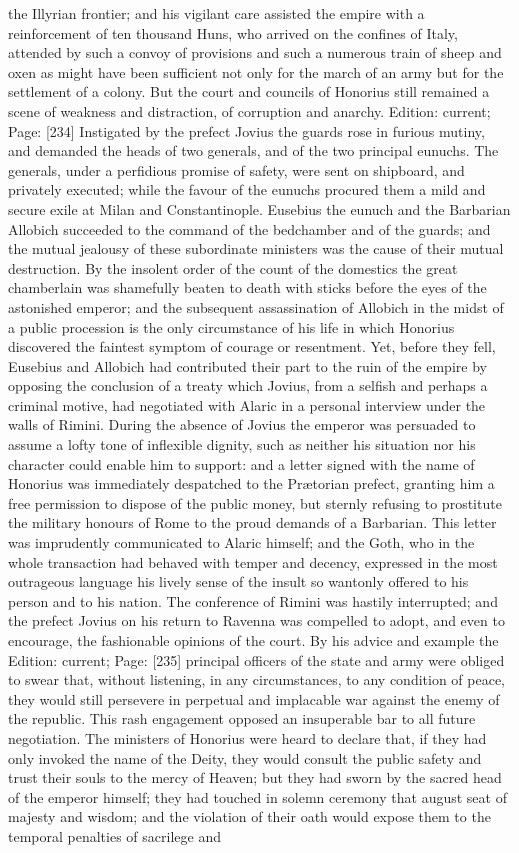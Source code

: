 the Illyrian frontier; and his vigilant care assisted the empire with a reinforcement of ten thousand Huns, who arrived on the confines of Italy, attended by such a convoy of provisions and such a numerous train of sheep and oxen as might have been sufficient not only for the march of an army but for the settlement of a colony. But the court and councils of Honorius still remained a scene of weakness and distraction, of corruption and anarchy. Edition: current; Page: [234] Instigated by the prefect Jovius the guards rose in furious mutiny, and demanded the heads of two generals, and of the two principal eunuchs. The generals, under a perfidious promise of safety, were sent on shipboard, and privately executed; while the favour of the eunuchs procured them a mild and secure exile at Milan and Constantinople. Eusebius the eunuch and the Barbarian Allobich succeeded to the command of the bedchamber and of the guards; and the mutual jealousy of these subordinate ministers was the cause of their mutual destruction. By the insolent order of the count of the domestics the great chamberlain was shamefully beaten to death with sticks before the eyes of the astonished emperor; and the subsequent assassination of Allobich in the midst of a public procession is the only circumstance of his life in which Honorius discovered the faintest symptom of courage or resentment. Yet, before they fell, Eusebius and Allobich had contributed their part to the ruin of the empire by opposing the conclusion of a treaty which Jovius, from a selfish and perhaps a criminal motive, had negotiated with Alaric in a personal interview under the walls of Rimini. During the absence of Jovius the emperor was persuaded to assume a lofty tone of inflexible dignity, such as neither his situation nor his character could enable him to support: and a letter signed with the name of Honorius was immediately despatched to the Prætorian prefect, granting him a free permission to dispose of the public money, but sternly refusing to prostitute the military honours of Rome to the proud demands of a Barbarian. This letter was imprudently communicated to Alaric himself; and the Goth, who in the whole transaction had behaved with temper and decency, expressed in the most outrageous language his lively sense of the insult so wantonly offered to his person and to his nation. The conference of Rimini was hastily interrupted; and the prefect Jovius on his return to Ravenna was compelled to adopt, and even to encourage, the fashionable opinions of the court. By his advice and example the Edition: current; Page: [235] principal officers of the state and army were obliged to swear that, without listening, in any circumstances, to any condition of peace, they would still persevere in perpetual and implacable war against the enemy of the republic. This rash engagement opposed an insuperable bar to all future negotiation. The ministers of Honorius were heard to declare that, if they had only invoked the name of the Deity, they would consult the public safety and trust their souls to the mercy of Heaven; but they had sworn by the sacred head of the emperor himself; they had touched in solemn ceremony that august seat of majesty and wisdom; and the violation of their oath would expose them to the temporal penalties of sacrilege and 